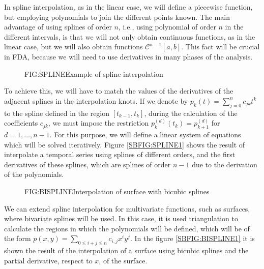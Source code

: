 
In spline interpolation, as in the linear case, we will define a piecewise
function, but employing polynomials to join the different points known.
The main advantage of using splines of order $n$, i.e., using polynomial of
order $n$ in the different intervals, is that we will not only obtain continuous
functions, as in the linear case, but we will also obtain functions
$\mathcal{C}^{n-1}[a,b]$. This fact will be crucial in FDA, because we will need
to use derivatives in many phases of the analysis.

\begin{figure}[Example of spline interpolation]{FIG:SPLINE}{Example of spline interpolation}
	 \quad
\end{figure}

To achieve this, we will have to match the values of the derivatives of the
adjacent splines in the interpolation knots. If we denote by
$p_k(t)=\sum_{j=0}^n c_{jk} t^k$ to the spline defined in the region
$[t_{k-1}, t_{k}]$, during the calculation of the coefficients $c_{jk}$, we must
impose the restriction $p_{k}^{(d)}(t_k) = p_{k+1}^{(d)}$ for $d=1, \dots, n-1$.
For this purpose, we will define a linear system of equations which will be
solved iteratively. Figure \ref{SBFIG:SPLINE1} shows the result of interpolate a
temporal series using splines of different orders, and the first derivatives of
these splines, which are splines of order $n-1$ due to the derivation of the
polynomials.

\begin{figure}[Interpolation of surface]{FIG:BISPLINE}{Interpolation of surface with bicubic splines}
	 \quad
\end{figure}

We can extend spline interpolation for multivariate functions, such as surfaces,
where bivariate splines will be used. In this case, it is used triangulation
to calculate the regions in which the polynomials will be defined, which will
be of the form $p(x, y) = \sum_{0 \le i + j \le n} c_{i,j}x^i y^j$.
In the figure \ref{SBFIG:BISPLINE1} it is shown the result of the
interpolation of a surface using bicubic splines and the partial derivative,
respect to $x$, of the surface.

